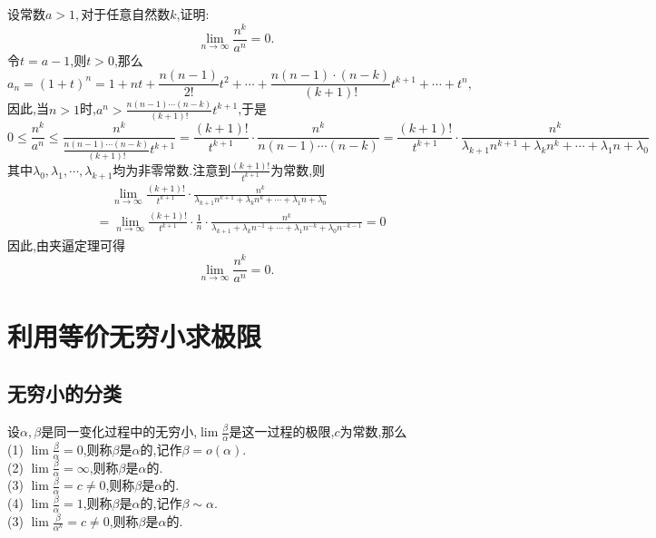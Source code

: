 \examples 设常数$a>1,$对于任意自然数$k$,证明:
\begin{equation*}
\lim\limits_{n \to \infty}\frac{n^k}{a^n}=0.
\end{equation*}
\hspace*{-0.5em}\proof 令$t=a-1$,则$t>0$,那么
\[
a_n=(1+t)^n=1+nt+\frac{n(n-1)}{2!}t^2+\cdots+\frac{n(n-1)\cdot(n-k)}{(k+1)!}t^{k+1}+\cdots+t^n,
\]
因此,当$n>1$时,$\displaystyle a^n>\frac{n(n-1)\cdots(n-k)}{(k+1)!}t^{k+1}$,于是
\[
0 \le \frac{n^k}{a^n}\le \frac{n^k}{\displaystyle \frac{n(n-1)\cdots(n-k)}{(k+1)!}t^{k+1}}=\frac{(k+1)!}{t^{k+1}}\cdot \frac{n^k}{n(n-1)\cdots(n-k)}=\frac{(k+1)!}{t^{k+1}}\cdot\frac{n^k}{\lambda_{k+1}n^{k+1}+\lambda_kn^k+\cdots+\lambda_1n+\lambda_0}
\]
其中$\lambda_0,\lambda_1,\cdots,\lambda_{k+1}$均为非零常数.注意到$\displaystyle \frac{(k+1)!}{t^{k+1}}$为常数,则
\begin{equation*}
\begin{split}
&\quad \, \lim\limits_{n \to \infty}\frac{(k+1)!}{t^{k+1}}\cdot\frac{n^k}{\lambda_{k+1}n^{k+1}+\lambda_kn^k+\cdots+\lambda_1n+\lambda_0}\\
&=\lim\limits_{n \to \infty}\frac{(k+1)!}{t^{k+1}}\cdot\frac{1}{n}\cdot \frac{n^k}{\lambda_{k+1}+\lambda_kn^{-1}+\cdots+\lambda_1n^{-k}+\lambda_0n^{-k-1}}=0
\end{split}
\end{equation*}
因此,由夹逼定理可得
\begin{equation*}
\lim\limits_{n \to \infty}\frac{n^k}{a^n}=0.
\end{equation*}

\section{利用等价无穷小求极限}
\subsection{无穷小的分类}
\tdefination[无穷小的分类]
设$\alpha,\beta $是同一变化过程中的无穷小,$\displaystyle \lim \frac{\beta}{\alpha}$是这一过程的极限,$c$为常数,那么\\[0.5em]
\noindent (1) \quad $\displaystyle \lim \frac{\beta }{\alpha}=0$,则称$\beta $是$\alpha $的,记作$\beta = o(\alpha)$.\\[0.5em]
\noindent (2) \quad  $\displaystyle \lim \frac{\beta }{\alpha}=\infty$,则称$\beta $是$\alpha $的.\\[0.5em]
\noindent (3) \quad  $\displaystyle \lim \frac{\beta }{\alpha}=c \ne 0$,则称$\beta $是$\alpha $的.\\[0.5em]
\noindent (4) \quad  $\displaystyle \lim \frac{\beta }{\alpha}=1$,则称$\beta $是$\alpha $的,记作$\beta \sim \alpha$.\\[0.5em]
\noindent (3) \quad  $\displaystyle \lim \frac{\beta }{\alpha^k}=c \ne 0$,则称$\beta $是$\alpha $的.

